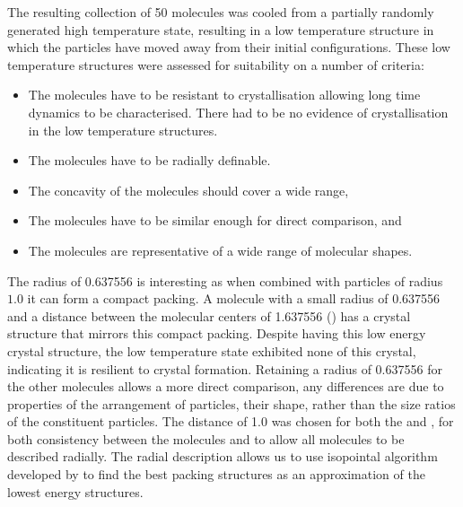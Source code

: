 The resulting collection of 50 molecules was cooled from a partially randomly generated high temperature state, resulting in a low temperature structure in which the particles have moved away from their initial configurations. These low temperature structures were assessed for suitability on a number of criteria:
\begin{itemize}
    \item The molecules have to be resistant to crystallisation allowing long time dynamics to be characterised. There had to be no evidence of crystallisation in the low temperature structures.
    \item The molecules have to be radially definable.
    \item The concavity of the molecules should cover a wide range,
    \item The molecules have to be similar enough for direct comparison, and
    \item The molecules are representative of a wide range of molecular shapes.
\end{itemize}
The radius of 0.637556 is interesting as when combined with particles of radius $1.0$ it can form a compact packing. A molecule with a small radius of 0.637556 and a distance between the molecular centers of 1.637556 (\scon) has a crystal structure that mirrors this compact packing. Despite \scon having this low energy crystal structure, the low temperature state exhibited none of this crystal, indicating it is resilient to crystal formation. Retaining a radius of 0.637556 for the other molecules allows a more direct comparison, any differences are due to properties of the arrangement of particles, their shape, rather than the size ratios of the constituent particles. The distance of 1.0 was chosen for both the \tri and \sone, for both consistency between the molecules and to allow all molecules to be described radially. The radial description allows us to use isopointal algorithm developed by \textcite{hudson:10} to find the best packing structures as an approximation of the lowest energy structures.


